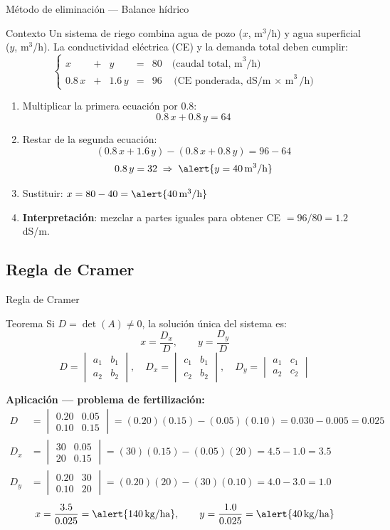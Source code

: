 \documentclass[11pt, aspectratio=169]{beamer}
\newcommand{\deter}[4]{\begin{vmatrix} #1 & #2 \\ #3 & #4 \end{vmatrix}}
\newcommand{\unidad}[1]{\,\text{#1}}
\begin{document}
	\begin{frame}{Método de eliminación — Balance hídrico}
		\begin{exampleblock}{Contexto}
			Un sistema de riego combina agua de pozo ($x$, m$^3$/h)
			y agua superficial ($y$, m$^3$/h). La conductividad eléctrica (CE)
			y la demanda total deben cumplir:
			\[
			\left\{
			\begin{array}{rcrcr}
				x  & + &  y  & = & 80 \quad \text{(caudal total, m}^3\text{/h)} \\[4pt]
				0.8\,x & + & 1.6\,y & = & 96 \quad \text{(CE ponderada, dS/m $\times$ m}^3\text{/h)}
			\end{array}
			\right.
			\]
		\end{exampleblock}
		
		\begin{enumerate}
			\item<2-> Multiplicar la primera ecuación por $0.8$:
			\[ 0.8\,x + 0.8\,y = 64 \]
			
			\item<3-> Restar de la segunda ecuación:
			\[ (0.8\,x + 1.6\,y) - (0.8\,x + 0.8\,y) = 96 - 64 \]
			\[ 0.8\,y = 32 \;\Rightarrow\; \alert{y = 40 \unidad{m}^3\text{/h}} \]
			
			\item<4-> Sustituir: $x = 80 - 40 = \alert{40 \unidad{m}^3\text{/h}}$
			
			\item<5-> \textbf{Interpretación}: mezclar a partes iguales para obtener
			CE $= 96/80 = 1.2$ dS/m.
		\end{enumerate}
	\end{frame}
	
	\subsection{Regla de Cramer}
	
	\begin{frame}{Regla de Cramer}
		\begin{block}{Teorema}
			Si $D = \det(A) \neq 0$, la solución única del sistema es:
			\[
			x = \frac{D_x}{D}, \qquad y = \frac{D_y}{D}
			\]
			\[
			D = \deter{a_1}{b_1}{a_2}{b_2}, \quad
			D_x = \deter{c_1}{b_1}{c_2}{b_2}, \quad
			D_y = \deter{a_1}{c_1}{a_2}{c_2}
			\]
		\end{block}
		
		\pause
		\textbf{Aplicación — problema de fertilización:}
		\begin{align*}
			D   &= \deter{0.20}{0.05}{0.10}{0.15}
			= (0.20)(0.15)-(0.05)(0.10) = 0.030 - 0.005 = 0.025 \\[4pt]
			D_x &= \deter{30}{0.05}{20}{0.15}
			= (30)(0.15)-(0.05)(20) = 4.5 - 1.0 = 3.5 \\[4pt]
			D_y &= \deter{0.20}{30}{0.10}{20}
			= (0.20)(20)-(30)(0.10) = 4.0 - 3.0 = 1.0
		\end{align*}
		\pause
		\[
		x = \frac{3.5}{0.025} = \alert{140 \unidad{kg/ha}}, \qquad
		y = \frac{1.0}{0.025} = \alert{40 \unidad{kg/ha}}
		\]
	\end{frame}
	
\end{document}
